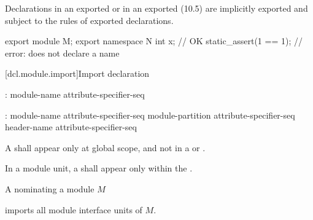 \begin{std.txt}
  \alinea
  Declarations in an exported  
  or in an exported  (10.5)
  are
  implicitly exported and subject to the rules of exported declarations.
  \begin{example}
    \begin{codeblock}
    export module M;
    export namespace N {
      int x;                    // OK
      static_assert(1 == 1);    // error: does not declare a name
    }
    \end{codeblock}
  \end{example}
\end{std.txt}


[dcl.module.import]{Import declaration}%

\begin{std.txt}\color{addclr}
\begin{before}
  \begin{bnf}\color{addclr}
    :\br
       module-name attribute-specifier-seq\opt {} \terminal{;}
  \end{bnf}
\end{before}\begin{after}
  \begin{bnf}\color{addclr}
    :\br
      \opt{}  module-name attribute-specifier-seq\opt {} \terminal{;}\br
      \opt{}  module-partition attribute-specifier-seq\opt {} \terminal{;}\br
      \opt{}  header-name attribute-specifier-seq\opt {} \terminal{;}
  \end{bnf}
\end{after}

  \resetalinea[0]
  \alinea
  A  shall appear only at
  global scope, and not in a 
  or .
  \begin{after}\color{addclr}
  In a module unit, a  shall
  appear only within the .

  \alinea
  \end{after}
  A  nominating a module $M$
  \begin{after}\color{addclr}
  imports all module interface units of $M$.
  \end{after}


\end{std.txt}
